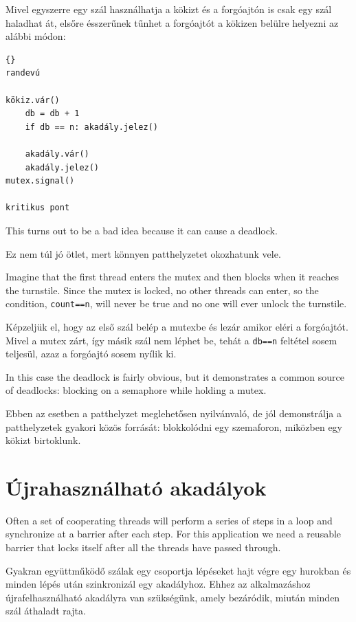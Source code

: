 \documentclass{book}
\begin{document}
Mivel egyszerre egy szál használhatja a kökizt és a forgóajtón is csak egy szál
haladhat át, elsőre ésszerűnek tűnhet a forgóajtót a kökizen belülre helyezni
az alábbi módon:

\begin{lstlisting}[title={Rossz akadály megoldás}]{}
randevú

kökiz.vár()
    db = db + 1
    if db == n: akadály.jelez()

    akadály.vár()
    akadály.jelez()
mutex.signal()

kritikus pont
\end{lstlisting}

This turns out to be a bad idea because it can cause a
deadlock.

Ez nem túl jó ötlet, mert könnyen patthelyzetet okozhatunk vele.

Imagine that the first thread enters the
mutex and then blocks when it reaches the turnstile.
Since the mutex is locked, no other threads can enter,
so the condition, {\tt count==n}, will never be true and
no one will ever unlock the turnstile.

Képzeljük el, hogy az első szál belép a mutexbe és lezár amikor eléri
a forgóajtót. Mivel a mutex zárt, így másik szál nem léphet be, tehát
a {\tt db==n} feltétel sosem teljesül, azaz a forgóajtó sosem nyílik ki.

In this case the deadlock is fairly obvious, but it
demonstrates a
common source of deadlocks: blocking on a semaphore while
holding a mutex.

Ebben az esetben a patthelyzet meglehetősen nyilvánvaló, de jól demonstrálja a
patthelyzetek gyakori közös forrását: blokkolódni egy szemaforon,
miközben egy kökizt birtoklunk.

\section{Újrahasználható akadályok}
\label{rebar}

Often a set of cooperating threads will perform a series of steps
in a loop and synchronize at a barrier after each step.  For this
application we need a reusable barrier that locks itself after
all the threads have passed through.

Gyakran együttműködő szálak egy csoportja lépéseket hajt végre egy
hurokban és minden lépés után szinkronizál egy akadályhoz. Ehhez az
alkalmazáshoz újrafelhasználható akadályra van szükségünk, amely bezáródik,
miután minden szál áthaladt rajta.
\end{document}
